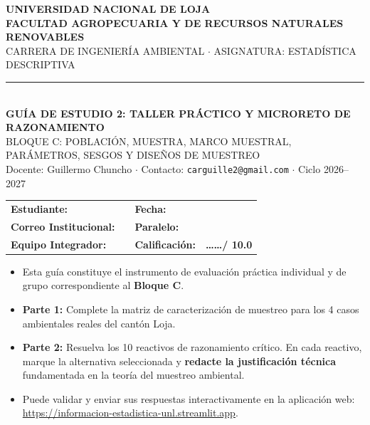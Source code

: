 \documentclass[11pt,a4paper]{article}
\begin{document}
\begin{bannerbox}
\centering
{\large\bfseries\color{white} UNIVERSIDAD NACIONAL DE LOJA}\\[2pt]
{\small\bfseries\color{white} FACULTAD AGROPECUARIA Y DE RECURSOS NATURALES RENOVABLES}\\[2pt]
{\footnotesize\color{white} CARRERA DE INGENIERÍA AMBIENTAL $\cdot$ ASIGNATURA: ESTADÍSTICA DESCRIPTIVA}\\[4pt]
\rule{\linewidth}{0.5pt}\\[4pt]
{\large\bfseries\color{white} GUÍA DE ESTUDIO 2: TALLER PRÁCTICO Y MICRORETO DE RAZONAMIENTO}\\[2pt]
{\footnotesize\color{white} BLOQUE C: POBLACIÓN, MUESTRA, MARCO MUESTRAL, PARÁMETROS, SESGOS Y DISEÑOS DE MUESTREO}\\[2pt]
{\scriptsize\color{white} Docente: Guillermo Chuncho $\cdot$ Contacto: \texttt{carguille2@gmail.com} $\cdot$ Ciclo 2026--2027}
\end{bannerbox}

\vspace{0.2cm}

\begin{estudiantebox}
\small
\begin{tabularx}{\linewidth}{p{3.5cm}Xp{2.5cm}X}
\textbf{Estudiante:} & \hrulefill & \textbf{Fecha:} & \hrulefill \\
\textbf{Correo Institucional:} & \hrulefill & \textbf{Paralelo:} & \hrulefill \\
\textbf{Equipo Integrador:} & \hrulefill & \textbf{Calificación:} & \textbf{\large \dots\dots / 10.0} \\
\end{tabularx}
\end{estudiantebox}

\vspace{0.2cm}

\begin{instruccionbox}
\begin{itemize}[leftmargin=*,noitemsep]
  \item Esta guía constituye el instrumento de evaluación práctica individual y de grupo correspondiente al \textbf{Bloque C}.
  \item \textbf{Parte 1:} Complete la matriz de caracterización de muestreo para los 4 casos ambientales reales del cantón Loja.
  \item \textbf{Parte 2:} Resuelva los 10 reactivos de razonamiento crítico. En cada reactivo, marque la alternativa seleccionada y \textbf{redacte la justificación técnica} fundamentada en la teoría del muestreo ambiental.
  \item Puede validar y enviar sus respuestas interactivamente en la aplicación web: \url{https://informacion-estadistica-unl.streamlit.app}.
\end{itemize}
\end{instruccionbox}
\end{document}
